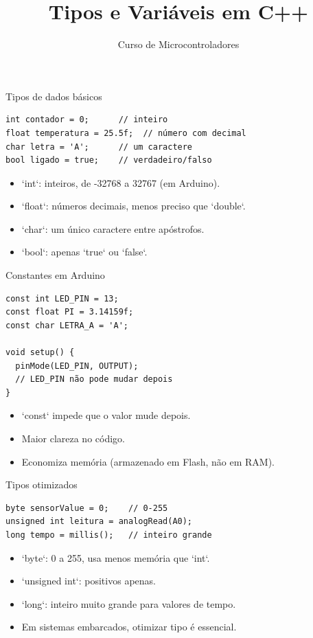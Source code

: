 \documentclass[10pt]{beamer}
\title{Tipos e Variáveis em C++}
\subtitle{Curso de Microcontroladores}
\author{}
\date{}
\begin{document}
\begin{frame}
  \titlepage
\end{frame}

\begin{frame}[fragile]{Tipos de dados básicos}
\begin{lstlisting}
int contador = 0;      // inteiro
float temperatura = 25.5f;  // número com decimal
char letra = 'A';      // um caractere
bool ligado = true;    // verdadeiro/falso
\end{lstlisting}

  \begin{itemize}
    \item `int`: inteiros, de -32768 a 32767 (em Arduino).
    \item `float`: números decimais, menos preciso que `double`.
    \item `char`: um único caractere entre apóstrofos.
    \item `bool`: apenas `true` ou `false`.
  \end{itemize}
\end{frame}

\begin{frame}[fragile]{Constantes em Arduino}
\begin{lstlisting}
const int LED_PIN = 13;
const float PI = 3.14159f;
const char LETRA_A = 'A';

void setup() {
  pinMode(LED_PIN, OUTPUT);
  // LED_PIN não pode mudar depois
}
\end{lstlisting}

  \begin{itemize}
    \item `const` impede que o valor mude depois.
    \item Maior clareza no código.
    \item Economiza memória (armazenado em Flash, não em RAM).
  \end{itemize}
\end{frame}

\begin{frame}[fragile]{Tipos otimizados}
\begin{lstlisting}
byte sensorValue = 0;    // 0-255
unsigned int leitura = analogRead(A0);
long tempo = millis();   // inteiro grande
\end{lstlisting}

  \begin{itemize}
    \item `byte`: 0 a 255, usa menos memória que `int`.
    \item `unsigned int`: positivos apenas.
    \item `long`: inteiro muito grande para valores de tempo.
    \item Em sistemas embarcados, otimizar tipo é essencial.
  \end{itemize}
\end{frame}
\end{document}
